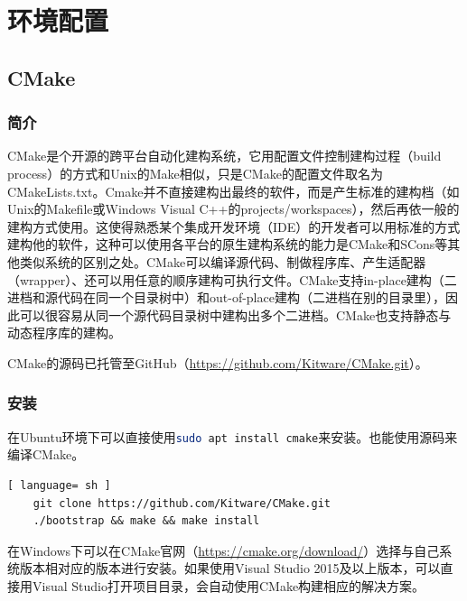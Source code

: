 \chapter{环境配置}
	\section{CMake}
		\subsection{简介}
			\par CMake是个开源的跨平台自动化建构系统，它用配置文件控制建构过程（build process）的方式和Unix的Make相似，只是CMake的配置文件取名为CMakeLists.txt。Cmake并不直接建构出最终的软件，而是产生标准的建构档（如Unix的Makefile或Windows Visual C++的projects/workspaces），然后再依一般的建构方式使用。这使得熟悉某个集成开发环境（IDE）的开发者可以用标准的方式建构他的软件，这种可以使用各平台的原生建构系统的能力是CMake和SCons等其他类似系统的区别之处。CMake可以编译源代码、制做程序库、产生适配器（wrapper）、还可以用任意的顺序建构可执行文件。CMake支持in-place建构（二进档和源代码在同一个目录树中）和out-of-place建构（二进档在别的目录里），因此可以很容易从同一个源代码目录树中建构出多个二进档。CMake也支持静态与动态程序库的建构。\cite{ wiki:CMake}
			\par CMake的源码已托管至GitHub（\href{https://github.com/Kitware/CMake.git}{https://github.com/Kitware/CMake.git}）。
		\subsection{安装}
			\par 在Ubuntu环境下可以直接使用\lstinline[language=sh]{sudo apt install cmake}来安装。也能使用源码来编译CMake。
			\begin{lstlisting}[ language= sh ]
	git clone https://github.com/Kitware/CMake.git
	./bootstrap && make && make install
			\end{lstlisting}
			\par 在Windows下可以在CMake官网（\href{https://cmake.org/download/}{https://cmake.org/download/}）选择与自己系统版本相对应的版本进行安装。如果使用Visual Studio 2015及以上版本，可以直接用Visual Studio打开项目目录，会自动使用CMake构建相应的解决方案。
